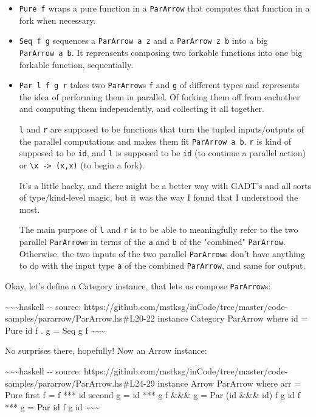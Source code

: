 \documentclass[]{article}
\begin{document}
\begin{itemize}
\item
  \texttt{Pure\ f} wraps a pure function in a \texttt{ParArrow} that computes
  that function in a fork when necessary.
\item
  \texttt{Seq\ f\ g} sequences a \texttt{ParArrow\ a\ z} and a
  \texttt{ParArrow\ z\ b} into a big \texttt{ParArrow\ a\ b}. It reprensents
  composing two forkable functions into one big forkable function, sequentially.
\item
  \texttt{Par\ l\ f\ g\ r} takes two \texttt{ParArrow}s \texttt{f} and
  \texttt{g} of different types and represents the idea of performing them in
  parallel. Of forking them off from eachother and computing them independently,
  and collecting it all together.

  \texttt{l} and \texttt{r} are supposed to be functions that turn the tupled
  inputs/outputs of the parallel computations and makes them fit
  \texttt{ParArrow\ a\ b}. \texttt{r} is kind of supposed to be \texttt{id}, and
  \texttt{l} is supposed to be \texttt{id} (to continue a parallel action) or
  \texttt{\textbackslash{}x\ -\textgreater{}\ (x,x)} (to begin a fork).

  It's a little hacky, and there might be a better way with GADT's and all sorts
  of type/kind-level magic, but it was the way I found that I understood the
  most.

  The main purpose of \texttt{l} and \texttt{r} is to be able to meaningfully
  refer to the two parallel \texttt{ParArrow}s in terms of the \texttt{a} and
  \texttt{b} of the "combined" \texttt{ParArrow}. Otherwise, the two inputs of
  the two parallel \texttt{ParArrow}s don't have anything to do with the input
  type \texttt{a} of the combined \texttt{ParArrow}, and same for output.
\end{itemize}

Okay, let's define a Category instance, that lets us compose \texttt{ParArrow}s:

\textasciitilde{}\textasciitilde{}\textasciitilde{}haskell -\/- source:
https://github.com/mstksg/inCode/tree/master/code-samples/pararrow/ParArrow.hs\#L20-22
instance Category ParArrow where id = Pure id f . g = Seq g f
\textasciitilde{}\textasciitilde{}\textasciitilde{}

No surprises there, hopefully! Now an Arrow instance:

\textasciitilde{}\textasciitilde{}\textasciitilde{}haskell -\/- source:
https://github.com/mstksg/inCode/tree/master/code-samples/pararrow/ParArrow.hs\#L24-29
instance Arrow ParArrow where arr = Pure first f = f *** id second g = id *** g
f \&\&\& g = Par (id \&\&\& id) f g id f *** g = Par id f g id
\textasciitilde{}\textasciitilde{}\textasciitilde{}
\end{document}
